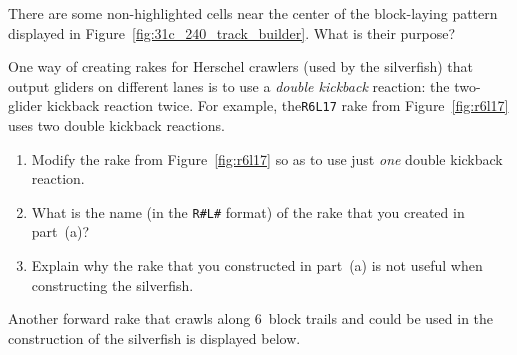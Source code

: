 \vspace*{-0.4cm}\hrulefill\vspace*{-0.3cm}\footnotesize\begin{multicols}{2}\vspace*{-0.4cm}\raggedcolumns{}
\setlength{\parskip}{0pt}


\begin{problem}\label{exer:self_support_spaceships_track_layer_rephaser}
	There are some non-highlighted cells near the center of the block-laying pattern displayed in Figure~\ref{fig:31c_240_track_builder}. What is their purpose?
\end{problem}


\mfilbreak


\begin{problemstar}\label{exer:self_support_spaceships_r4l1}
	One way of creating rakes for Herschel crawlers (used by the silverfish) that output gliders on different lanes is to use a \emph{double kickback} reaction: the two-glider kickback reaction twice. For example, the\texttt{R6L17} rake from Figure~\ref{fig:r6l17} uses two double kickback reactions.
	
	\begin{enumerate}[label=\bf\color{ocre}(\alph*)]
		\item Modify the rake from Figure~\ref{fig:r6l17} so as to use just \emph{one} double kickback reaction.
		
		\item What is the name (in the \texttt{R\#L\#} format) of the rake that you created in part~(a)?
		
		\item Explain why the rake that you constructed in part~(a) is not useful when constructing the silverfish.
	\end{enumerate}
\end{problemstar}


\mfilbreak


\begin{problem}\label{exer:self_support_spaceships_r6l21}
	Another forward rake that crawls along $6$~block trails and could be used in the construction of the silverfish is displayed below.
	\begin{center}
	\end{center}
	

\end{problem}
\end{multicols}
